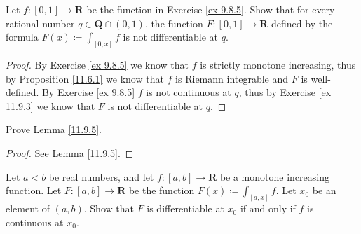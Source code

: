 \exercisesection

\begin{exercise}\label{ex 11.9.1}
    Let \(f : [0, 1] \to \mathbf{R}\) be the function in Exercise \ref{ex 9.8.5}.
    Show that for every rational number \(q \in \mathbf{Q} \cap (0, 1)\), the function \(F : [0, 1] \to \mathbf{R}\) defined by the formula \(F(x) \coloneqq \int_{[0, x]} f\) is not differentiable at \(q\).
\end{exercise}

\begin{proof}
    By Exercise \ref{ex 9.8.5} we know that \(f\) is strictly monotone increasing, thus by Proposition \ref{11.6.1} we know that \(f\) is Riemann integrable and \(F\) is well-defined.
    By Exercise \ref{ex 9.8.5} \(f\) is not continuous at \(q\), thus by Exercise \ref{ex 11.9.3} we know that \(F\) is not differentiable at \(q\).
\end{proof}

\begin{exercise}\label{ex 11.9.2}
    Prove Lemma \ref{11.9.5}.
\end{exercise}

\begin{proof}
    See Lemma \ref{11.9.5}.
\end{proof}

\begin{exercise}\label{ex 11.9.3}
    Let \(a < b\) be real numbers, and let \(f : [a, b] \to \mathbf{R}\) be a monotone increasing function.
    Let \(F : [a, b] \to \mathbf{R}\) be the function \(F(x) \coloneqq \int_{[a, x]} f\).
    Let \(x_0\) be an element of \((a, b)\).
    Show that \(F\) is differentiable at \(x_0\) if and only if \(f\) is continuous at \(x_0\).
\end{exercise}

